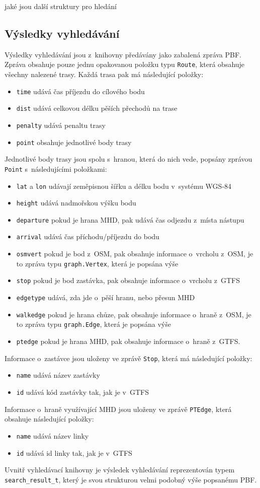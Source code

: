 \TODO jaké jsou další struktury pro hledání

\subsection{Výsledky vyhledávání}
\label{ch:formaty-dat:vysledky}
Výsledky vyhledávání jsou z~knihovny předávány jako zabalená zpráva PBF. Zpráva
obsahuje pouze jednu opakovanou položku typu {\tt Route}, která obsahuje všechny
nalezené trasy. Každá trasa pak má následující položky: 
\begin{itemize}
	\item {\tt time} udává čas příjezdu do cílového bodu
	\item {\tt dist} udává celkovou délku pěších přechodů na trase
	\item {\tt penalty} udává penaltu trasy
	\item {\tt point} obsahuje jednotlivé body trasy
\end{itemize}
Jednotlivé body trasy jsou spolu s~hranou, která do nich vede, popsány zprávou
{\tt Point} s~následujícími položkami: 
\begin{itemize}
	\item {\tt lat} a {\tt lon} udávají zeměpisnou šířku a délku bodu
v~systému WGS-84
	\item {\tt height} udává nadmořskou výšku bodu
	\item {\tt departure} pokud je hrana MHD, pak udává čas odjezdu z~místa
	nástupu
	\item {\tt arrival} udává čas příchodu/příjezdu do bodu 
	\item {\tt osmvert} pokud je bod z~OSM, pak obsahuje informace o~vrcholu
	z~OSM, je to zpráva typu {\tt graph.Vertex}, která je popsána výše
	\item {\tt stop} pokud je bod zastávka, pak obsahuje informace o~vrcholu z~GTFS
	\item {\tt edgetype} udává, zda jde o~pěší hranu, nebo přesun MHD
	\item {\tt walkedge} pokud je hrana chůze, pak obsahuje informace
o~hraně z~OSM, je to zpráva typu {\tt graph.Edge}, která je popsána výše
	\item {\tt ptedge} pokud je hrana MHD, pak obsahuje informace o~hraně
z~GTFS.
\end{itemize}
Informace o~zastávce jsou uloženy ve zprávě {\tt Stop}, která má následující
položky:
\begin{itemize}
	\item {\tt name} udává název zastávky
	\item {\tt id} udává kód zastávky tak, jak je v~GTFS
\end{itemize}
Informace o~hraně využívající MHD jsou uloženy ve zprávě {\tt PTEdge}, která
obsahuje následující položky:
\begin{itemize}
	\item {\tt name} udává název linky
	\item {\tt id} udává id linky tak, jak je v~GTFS
\end{itemize}
Uvnitř vyhledávací knihovny je výsledek vyhledávání reprezentován typem {\tt
search\_result\_t}, který je svou strukturou velmi podobný výše popsanému PBF.

